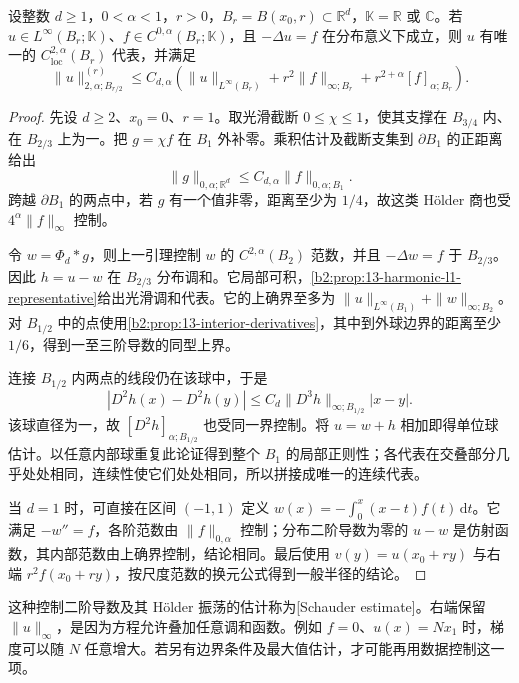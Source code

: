 \begin{theorem}
\label{b2:thm:18-poisson-schauder}
设整数 \(d\ge1\)，\(0<\alpha<1\)，\(r>0\)，\(B_r=B(x_0,r)\subset\mathbb R^d\)，\(\mathbb K=\mathbb R\) 或 \(\mathbb C\)。若 \(u\in L^\infty(B_r;\mathbb K)\)、\(f\in C^{0,\alpha}(B_r;\mathbb K)\)，且 \(-\Delta u=f\) 在分布意义下成立，则 \(u\) 有唯一的 \(C^{2,\alpha}_{\mathrm{loc}}(B_r)\) 代表，并满足
\begin{equation}
\label{b2:eq:18-poisson-schauder}
 \|u\|_{2,\alpha;B_{r/2}}^{(r)}
 \le C_{d,\alpha}\left(
 \|u\|_{L^\infty(B_r)}+r^2\|f\|_{\infty;B_r}
 +r^{2+\alpha}[f]_{\alpha;B_r}\right).
\end{equation}
\end{theorem}
\begin{proof}
先设 \(d\ge2\)、\(x_0=0\)、\(r=1\)。取光滑截断 \(0\le\chi\le1\)，使其支撑在 \(B_{3/4}\) 内、在 \(B_{2/3}\) 上为一。把 \(g=\chi f\) 在 \(B_1\) 外补零。乘积估计及截断支集到 \(\partial B_1\) 的正距离给出
\[
 \|g\|_{0,\alpha;\mathbb R^d}\le C_{d,\alpha}\|f\|_{0,\alpha;B_1}.
\]
跨越 \(\partial B_1\) 的两点中，若 \(g\) 有一个值非零，距离至少为 \(1/4\)，故这类 Hölder 商也受 \(4^\alpha\|f\|_\infty\) 控制。

令 \(w=\Phi_d*g\)，则上一引理控制 \(w\) 的 \(C^{2,\alpha}(B_2)\) 范数，并且 \(-\Delta w=f\) 于 \(B_{2/3}\)。因此 \(h=u-w\) 在 \(B_{2/3}\) 分布调和。它局部可积，\cref{b2:prop:13-harmonic-l1-representative}给出光滑调和代表。它的上确界至多为 \(\|u\|_{L^\infty(B_1)}+\|w\|_{\infty;B_2}\)。对 \(B_{1/2}\) 中的点使用\cref{b2:prop:13-interior-derivatives}，其中到外球边界的距离至少 \(1/6\)，得到一至三阶导数的同型上界。

连接 \(B_{1/2}\) 内两点的线段仍在该球中，于是
\[
 |D^2h(x)-D^2h(y)|\le C_d\|D^3h\|_{\infty;B_{1/2}}|x-y|.
\]
该球直径为一，故 \([D^2h]_{\alpha;B_{1/2}}\) 也受同一界控制。将 \(u=w+h\) 相加即得单位球估计。以任意内部球重复此论证得到整个 \(B_1\) 的局部正则性；各代表在交叠部分几乎处处相同，连续性使它们处处相同，所以拼接成唯一的连续代表。

当 \(d=1\) 时，可直接在区间 \((-1,1)\) 定义 \(w(x)=-\int_0^x(x-t)f(t)\,\mathrm dt\)。它满足 \(-w''=f\)，各阶范数由 \(\|f\|_{0,\alpha}\) 控制；分布二阶导数为零的 \(u-w\) 是仿射函数，其内部范数由上确界控制，结论相同。最后使用 \(v(y)=u(x_0+ry)\) 与右端 \(r^2f(x_0+ry)\)，按尺度范数的换元公式得到一般半径的结论。
\end{proof}

这种控制二阶导数及其 Hölder 振荡的估计称为[Schauder estimate]。右端保留 \(\|u\|_\infty\)，是因为方程允许叠加任意调和函数。例如 \(f=0\)、\(u(x)=Nx_1\) 时，梯度可以随 \(N\) 任意增大。若另有边界条件及最大值估计，才可能再用数据控制这一项。

